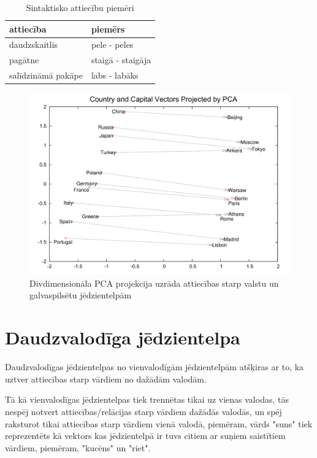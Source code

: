 \begin{table}[htbp]
	\centering
	\caption{Sintaktisko attiecību piemēri \cite{word2vec2013}}
	\begin{tabular}{ll}\toprule
		attiecība & piemērs  \\\midrule
		daudzskaitlis   & pele - peles \\
		pagātne   & staigā - staigāja \\
		salīdzināmā pakāpe   & labs - labāks \\\bottomrule
	\end{tabular}%
	\label{tab:sintactic-relationship-examples}%
\end{table}


\begin{figure}[h]
	\centering
	\includegraphics[width=\textwidth]{figures/word2vec-country-capital.png}
	\caption{Divdimensionāla PCA projekcija uzrāda attiecības starp valstu un galvaspilsētu jēdzientelpām \cite{colyer2016}}
	\label{fig:country-capital}%
\end{figure}



\section{Daudzvalodīga jēdzientelpa}

Daudzvalodīgas jēdzientelpas no vienvalodīgām jēdzientelpām atšķiras ar to, ka uztver attiecības starp vārdiem no dažādām valodām.

Tā kā vienvalodīgas jēdzientelpas tiek trennētas tikai uz vienas valodas, tās nespēj notvert attiecības/relācijas starp vārdiem dažādās valodās, un spēj raksturot tikai attiecības starp vārdiem vienā valodā, piemēram, vārds "suns" tiek reprezentēts kā vektors kas jēdzientelpā ir tuvs citiem ar suņiem saistītiem vārdiem, piemēram, "kucēns" un "riet".

